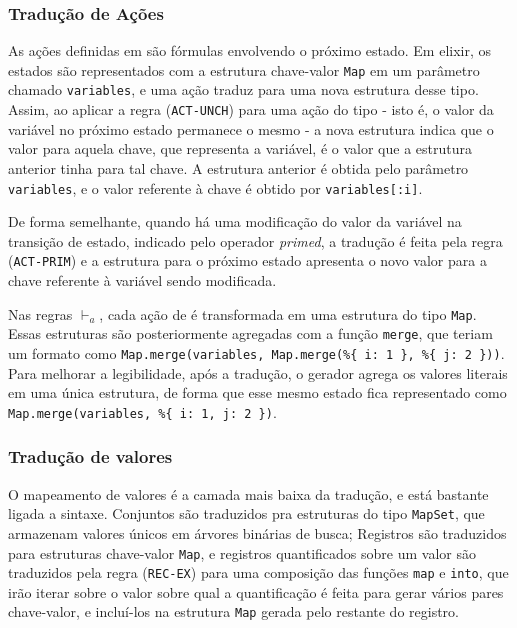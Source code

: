 

\subsubsection{Tradução de Ações}

As ações definidas em \TLA são fórmulas envolvendo o próximo estado. Em elixir,
os estados são representados com a estrutura chave-valor \texttt{Map} em um parâmetro chamado \texttt{variables}, e uma
ação traduz para uma nova estrutura desse tipo. Assim, ao aplicar a regra (\texttt{ACT-UNCH}) para uma ação do
tipo \UNCHANGED - isto é, o valor da variável no próximo estado permanece o
mesmo - a nova estrutura indica que o valor para aquela chave, que representa a
variável, é o valor que a estrutura anterior tinha para tal chave. A
estrutura anterior é obtida pelo parâmetro \texttt{variables}, e o valor referente à
chave \tti é obtido por \texttt{variables[:i]}.

De forma semelhante, quando há uma modificação do valor da variável na transição
de estado, indicado pelo operador \textit{primed}, a tradução é feita pela regra
(\texttt{ACT-PRIM}) e a estrutura para o próximo estado apresenta o
novo valor para a chave referente à variável sendo modificada.

Nas regras $\vdash_a$, cada ação de \TLA é transformada em uma estrutura do tipo
\texttt{Map}. Essas estruturas são posteriormente agregadas com a função
\texttt{merge}, que teriam um formato como \texttt{Map.merge(variables, Map.merge(\%\{ i: 1 \}, \%\{
  j: 2 \}))}. Para melhorar a legibilidade, após a tradução, o gerador agrega os
valores literais em uma única estrutura, de forma que esse mesmo estado fica
representado como \texttt{Map.merge(variables, \%\{ i: 1, j: 2 \})}.

\subsubsection{Tradução de valores}



O mapeamento de valores é a camada mais baixa da tradução, e está bastante
ligada a sintaxe. Conjuntos são traduzidos pra estruturas do tipo
\texttt{MapSet}, que armazenam valores únicos em árvores binárias de busca;
Registros são traduzidos para estruturas chave-valor \texttt{Map}, e registros
quantificados sobre um valor são traduzidos pela regra (\texttt{REC-EX}) para
uma composição das funções \texttt{map} e \texttt{into}, que irão iterar sobre o
valor sobre qual a quantificação é feita para gerar vários pares chave-valor, e
incluí-los na estrutura \texttt{Map} gerada pelo restante do registro.

